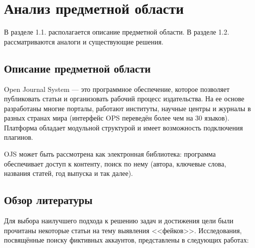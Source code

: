 \newpage
\section{Анализ предметной области}
\label{sec:Background}

В разделе 1.1. располагается описание предметной области. В разделе 1.2. рассматриваются аналоги и существующие решения.
\vspace{1.5em}

\subsection{Описание предметной области}
Open Journal System — это программное обеспечение, которое позволяет публиковать статьи и организовать рабочий процесс издательства. На ее основе разработаны многие порталы, работают институты, научные центры и журналы в разных странах мира (интерфейс OPS переведён более чем на 30 языков). Платформа обладает модульной структурой и имеет возможность подключения плагинов. 

OJS может быть рассмотрена как электронная библиотека: программа обеспечивает доступ к контенту, поиск по нему (автора, ключевые слова, названия статей, год выпуска и так далее). 
\vspace{1.5em}

\subsection{Обзор литературы}
Для выбора наилучшего подхода к решению задач и достижения цели были прочитаны некоторые статьи на тему выявления <<фейков>>. Исследования, посвящённые поиску фиктивных аккаунтов, представлены в следующих работах:


